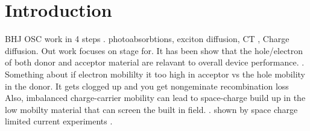 \chapter{Introduction}

BHJ OSC work in 4 steps . photoabsorbtions, exciton diffusion, CT , Charge diffusion. \citet{Fusella2019}
Out work focuses on stage for. It has been show that the hole/electron of both donor and 
acceptor material are relavant to overall device performance. \cite{Wang2019e}. Something about if electron mobililty it too high in acceptor vs the 
hole mobility in the donor. It gets clogged up and you get nongeminate recombination loss  Also, imbalanced charge-carrier
mobility can lead to space-charge build up in the low mobilty material that can screen the built in field.
\cite{Bartelt2015}. shown by space charge limited current experiments  \cite{Small2013}.

